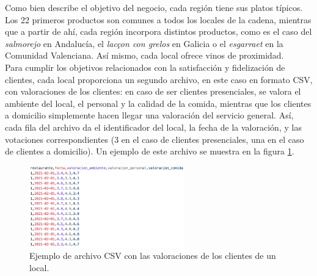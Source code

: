 \documentclass[12pt]{opticajnl}
\begin{document}
Como bien describe el objetivo del negocio, cada región tiene sus platos típicos. Los 22 primeros productos son comunes a todos los locales de la cadena, mientras que a partir de ahí, cada región incorpora distintos productos, como es el caso del \textit{salmorejo} en Andalucía, el \textit{lacçon con grelos} en Galicia o el \textit{esgarraet} en la Comunidad Valenciana. Así mismo, cada local ofrece vinos de proximidad. \\

Para cumplir los objetivos relacionados con la satisfacción y fidelización de clientes, cada local proporciona un segundo archivo, en este caso en formato CSV, con valoraciones de los clientes: en caso de ser clientes presenciales, se valora el ambiente del local, el personal y la calidad de la comida, mientras que los clientes a domicilio simplemente hacen llegar una valoración del servicio general. Así, cada fila del archivo da el identificador del local, la fecha de la valoración, y las votaciones correspondientes (3 en el caso de clientes presenciales, una en el caso de clientes a domicilio). Un ejemplo de este archivo se muestra en la figura \ref{fig:csv_valoraciones}.

\begin{figure}[h]
\centering
\includegraphics[width=0.6\textwidth]{fotos/2.png}
\caption{Ejemplo de archivo CSV con las valoraciones de los clientes de un local.}
\label{fig:csv_valoraciones}
\end{figure}
\end{document}
